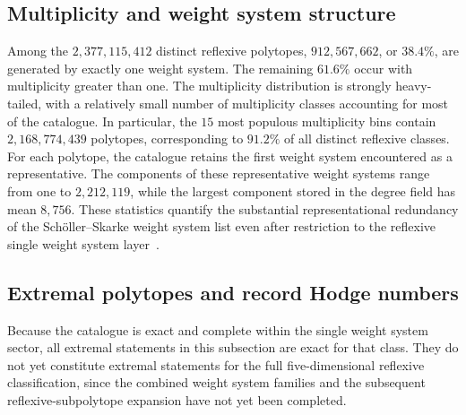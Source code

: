 \documentclass[appliedmath,article,submit,moreauthors]{Definitions/mdpi}
\begin{document}
\subsection{Multiplicity and weight system structure}
\label{sec:results-multiplicity}

Among the \(2{,}377{,}115{,}412\) distinct reflexive polytopes,
\(912{,}567{,}662\), or \(38.4\%\), are generated by exactly one weight system.
The remaining \(61.6\%\) occur with multiplicity greater than one. The
multiplicity distribution is strongly heavy-tailed, with a relatively small
number of multiplicity classes accounting for most of the catalogue. In
particular, the \(15\) most populous multiplicity bins contain
\(2{,}168{,}774{,}439\) polytopes, corresponding to \(91.2\%\) of all distinct
reflexive classes.
For each polytope, the catalogue retains the first weight system encountered as
a representative. The components of these representative weight systems range
from one to \(2{,}212{,}119\), while the largest component stored in the degree
field has mean \(8{,}756\). These statistics quantify the substantial
representational redundancy of the Sch\"oller--Skarke weight system list even
after restriction to the reflexive single weight system
layer~\cite{Scholler2019,Berglund2024}.

\subsection{Extremal polytopes and record Hodge numbers}
\label{sec:extremal}

Because the catalogue is exact and complete within the single weight system
sector, all extremal statements in this subsection are exact for that class.
They do not yet constitute extremal statements for the full five-dimensional
reflexive classification, since the combined weight system families and the
subsequent reflexive-subpolytope expansion have not yet been completed.
\end{document}
